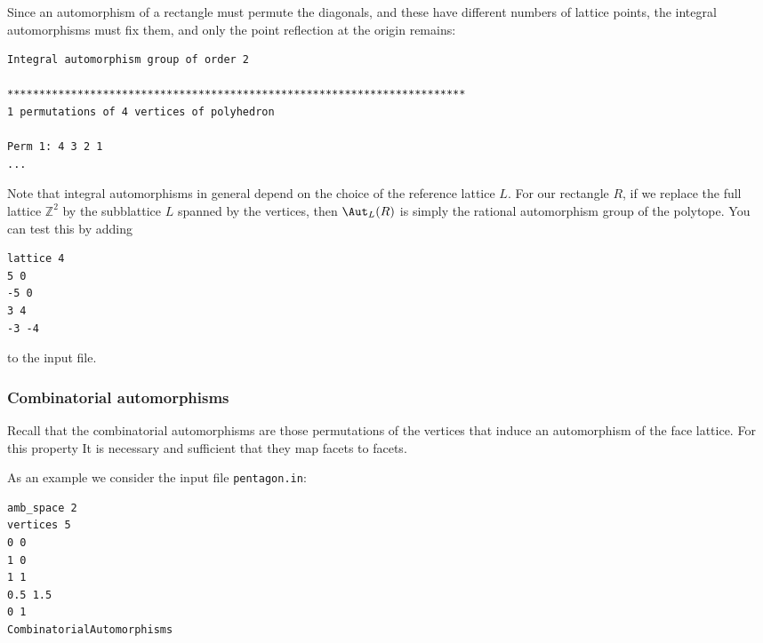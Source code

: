 \documentclass[12pt,a4paper]{scrartcl}
\theoremstyle{definition}
\def\ZZ{{\mathbb Z}}
\begin{document}
{Since an automorphism of a rectangle must permute the diagonals, and these have different numbers of lattice points, the integral automorphisms must fix them, and only the point reflection at the origin remains:
\begin{Verbatim}
Integral automorphism group of order 2

************************************************************************
1 permutations of 4 vertices of polyhedron

Perm 1: 4 3 2 1
...
\end{Verbatim}

Note that integral automorphisms in general depend on the choice of the reference lattice $L$. For our rectangle $R$, if we replace the full lattice $\ZZ^2$ by the subblattice $L$ spanned by the vertices, then $\Aut_L(R)$ is simply the rational automorphism group of the polytope. You can test this by adding
\begin{Verbatim}
lattice 4
5 0
-5 0
3 4
-3 -4
\end{Verbatim}
to the input file.

\subsubsection{Combinatorial automorphisms} 

Recall that the combinatorial automorphisms are those permutations of the vertices that induce an automorphism of the face lattice. For this property It is necessary and sufficient that they map facets to facets.

As an example we consider the input file \verb|pentagon.in|:

\begin{minipage}[b]{0.5\textwidth}
\begin{Verbatim}
amb_space 2
vertices 5
0 0
1 0
1 1
0.5 1.5
0 1
CombinatorialAutomorphisms
\end{Verbatim}
\end{minipage}
\hspace{1cm}
\begin{minipage}[t]{0.4\textwidth}
\end{minipage}

}
\end{document}
